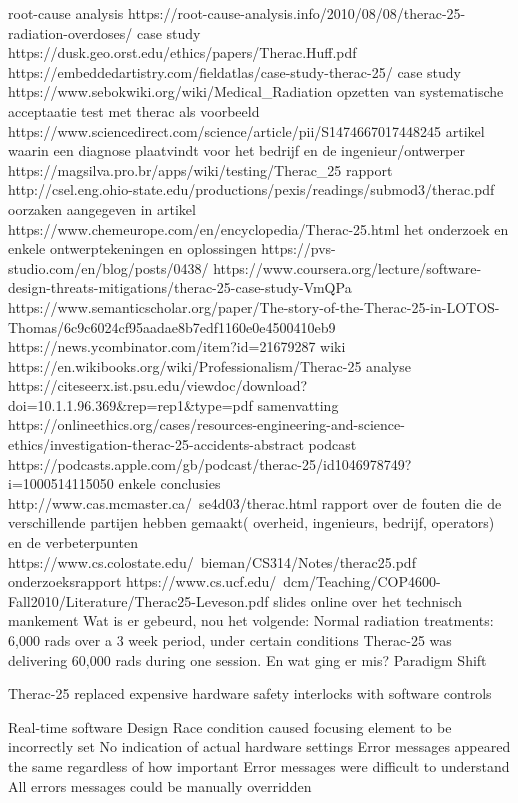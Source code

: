 root-cause analysis
https://root-cause-analysis.info/2010/08/08/therac-25-radiation-overdoses/
case study
https://dusk.geo.orst.edu/ethics/papers/Therac.Huff.pdf
https://embeddedartistry.com/fieldatlas/case-study-therac-25/
case study
https://www.sebokwiki.org/wiki/Medical_Radiation
opzetten van systematische acceptaatie test met therac als voorbeeld
https://www.sciencedirect.com/science/article/pii/S1474667017448245
artikel waarin een diagnose plaatvindt voor het bedrijf en de ingenieur/ontwerper
https://magsilva.pro.br/apps/wiki/testing/Therac_25
rapport
http://csel.eng.ohio-state.edu/productions/pexis/readings/submod3/therac.pdf
oorzaken aangegeven in artikel
https://www.chemeurope.com/en/encyclopedia/Therac-25.html
het onderzoek en enkele ontwerptekeningen en oplossingen
https://pvs-studio.com/en/blog/posts/0438/
https://www.coursera.org/lecture/software-design-threats-mitigations/therac-25-case-study-VmQPa
https://www.semanticscholar.org/paper/The-story-of-the-Therac-25-in-LOTOS-Thomas/6c9c6024cf95aadae8b7edf1160e0e4500410eb9
https://news.ycombinator.com/item?id=21679287
wiki
https://en.wikibooks.org/wiki/Professionalism/Therac-25
analyse
https://citeseerx.ist.psu.edu/viewdoc/download?doi=10.1.1.96.369&rep=rep1&type=pdf
samenvatting
https://onlineethics.org/cases/resources-engineering-and-science-ethics/investigation-therac-25-accidents-abstract
podcast
https://podcasts.apple.com/gb/podcast/therac-25/id1046978749?i=1000514115050
enkele conclusies
http://www.cas.mcmaster.ca/~se4d03/therac.html
rapport over de fouten die de verschillende partijen hebben gemaakt( overheid, ingenieurs, bedrijf, operators) en de verbeterpunten
https://www.cs.colostate.edu/~bieman/CS314/Notes/therac25.pdf
onderzoeksrapport
https://www.cs.ucf.edu/~dcm/Teaching/COP4600-Fall2010/Literature/Therac25-Leveson.pdf
slides online over het technisch mankement
Wat is er gebeurd, nou het volgende:
Normal radiation treatments: 6,000 rads over a 3 week period, under certain conditions Therac-25 was delivering 60,000 rads during one session.
En wat ging er mis?
Paradigm Shift

Therac-25 replaced expensive hardware safety interlocks with software controls

Real-time software
Design
Race condition caused focusing element to be incorrectly set
No indication of actual hardware settings
Error messages appeared the same regardless of how important
Error messages were difficult to understand
All errors messages could be manually overridden

